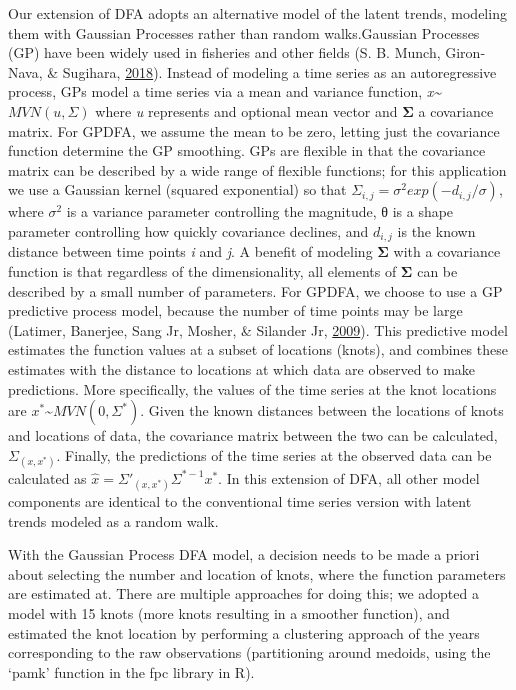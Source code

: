 \documentclass [11pt, proquest] {uwthesis}[2015/03/03]
\begin{document}
Our extension of DFA adopts an alternative model of the latent trends,
modeling them with Gaussian Processes rather than random walks.Gaussian
Processes (GP) have been widely used in fisheries and other fields (S.
B. Munch, Giron‐Nava, \& Sugihara,
\protect\hyperlink{ref-Munch2018}{2018}). Instead of modeling a time
series as an autoregressive process, GPs model a time series via a mean
and variance function, \emph{x\textasciitilde{}}\(MVN(u,\Sigma)\) where
\emph{u} represents and optional mean vector and \textbf{Σ} a covariance
matrix. For GPDFA, we assume the mean to be zero, letting just the
covariance function determine the GP smoothing. GPs are flexible in that
the covariance matrix can be described by a wide range of flexible
functions; for this application we use a Gaussian kernel (squared
exponential) so that \(\Sigma_{i,j}=\sigma^2 exp(-d_{i,j}/\sigma)\),
where \(\sigma^2\) is a variance parameter controlling the magnitude, θ
is a shape parameter controlling how quickly covariance declines, and
\(d_{i,j}\) is the known distance between time points \emph{i} and
\emph{j}. A benefit of modeling \textbf{Σ} with a covariance function is
that regardless of the dimensionality, all elements of \textbf{Σ} can be
described by a small number of parameters. For GPDFA, we choose to use a
GP predictive process model, because the number of time points may be
large (Latimer, Banerjee, Sang Jr, Mosher, \& Silander Jr,
\protect\hyperlink{ref-Latimer2009}{2009}). This predictive model
estimates the function values at a subset of locations (knots), and
combines these estimates with the distance to locations at which data
are observed to make predictions. More specifically, the values of the
time series at the knot locations are
\(x^*\)\textasciitilde{}\(MVN(0,\Sigma^*)\). Given the known distances
between the locations of knots and locations of data, the covariance
matrix between the two can be calculated, \(\Sigma_{(x,x^*)}\). Finally,
the predictions of the time series at the observed data can be
calculated as \(\hat{x}=\Sigma'_{(x,x^*)}\Sigma^{*-1}x^*\). In this
extension of DFA, all other model components are identical to the
conventional time series version with latent trends modeled as a random
walk.

With the Gaussian Process DFA model, a decision needs to be made a
priori about selecting the number and location of knots, where the
function parameters are estimated at. There are multiple approaches for
doing this; we adopted a model with 15 knots (more knots resulting in a
smoother function), and estimated the knot location by performing a
clustering approach of the years corresponding to the raw observations
(partitioning around medoids, using the `pamk' function in the fpc
library in R).
\end{document}
